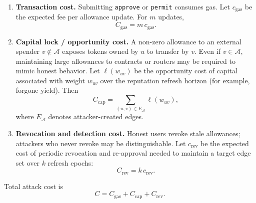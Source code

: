 \begin{enumerate}
\item \textbf{Transaction cost.} Submitting \texttt{approve} or \texttt{permit} consumes gas. Let $c_{\mathrm{gas}}$ be the expected fee per allowance update. For $m$ updates,
\begin{equation}
C_{\mathrm{gas}} = m\, c_{\mathrm{gas}}.
\end{equation}

\item \textbf{Capital lock / opportunity cost.} A non-zero allowance to an external spender $v\notin\mathcal{A}$ exposes tokens owned by $u$ to transfer by $v$. Even if $v\in\mathcal{A}$, maintaining large allowances to contracts or routers may be required to mimic honest behavior. Let $\ell(w_{uv})$ be the opportunity cost of capital associated with weight $w_{uv}$ over the reputation refresh horizon (for example, forgone yield). Then
\begin{equation}
C_{\mathrm{cap}} = \sum_{(u,v)\in E_{\mathcal{A}}} \ell(w_{uv}),
\end{equation}
where $E_{\mathcal{A}}$ denotes attacker-created edges.

\item \textbf{Revocation and detection cost.} Honest users revoke stale allowances; attackers who never revoke may be distinguishable. Let $c_{\mathrm{rev}}$ be the expected cost of periodic revocation and re-approval needed to maintain a target edge set over $k$ refresh epochs:
\begin{equation}
C_{\mathrm{rev}} = k\, c_{\mathrm{rev}}.
\end{equation}
\end{enumerate}

Total attack cost is
\begin{equation}
\label{eq:total-cost}
C = C_{\mathrm{gas}} + C_{\mathrm{cap}} + C_{\mathrm{rev}}.
\end{equation}



